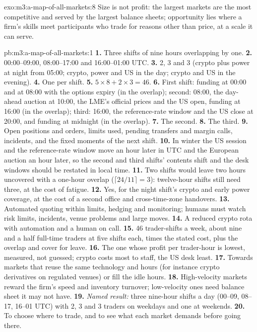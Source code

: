 \begin{solution}{exo:m3:a-map-of-all-markets:8}
Size is not profit: the largest markets are the most competitive and served by the largest balance sheets; opportunity lies where a firm's skills
meet participants who trade for reasons other than price, at a scale it can serve.
\end{solution}

\begin{solution}{pb:m3:a-map-of-all-markets:1}
\textbf{1.} Three shifts of nine hours overlapping by one. \textbf{2.} 00:00--09:00, 08:00--17:00 and 16:00--01:00 UTC. \textbf{3.} 2, 3 and 3
(crypto plus power at night from 05:00; crypto, power and US in the day; crypto and US in the evening). \textbf{4.} One per shift. \textbf{5.} $5
\times 8 + 2 \times 3 = 46$. \textbf{6.} First shift: funding at 00:00 and at 08:00 with the options expiry (in the overlap); second: 08:00, the
day-ahead auction at 10:00, the LME's official prices and the US open, funding at 16:00 (in the overlap); third: 16:00, the reference-rate window
and the US close at 20:00, and funding at midnight (in the overlap). \textbf{7.} The second. \textbf{8.} The third. \textbf{9.} Open positions and
orders, limits used, pending transfers and margin calls, incidents, and the fixed moments of the next shift. \textbf{10.} In winter the US session
and the reference-rate window move an hour later in UTC and the European auction an hour later, so the second and third shifts' contents shift and
the desk windows should be restated in local time. \textbf{11.} Two shifts would leave two hours uncovered with a one-hour overlap
($\lceil 24/11 \rceil = 3$): twelve-hour shifts still need three, at the cost of fatigue. \textbf{12.} Yes, for the night shift's crypto and early
power coverage, at the cost of a second office and cross-time-zone handovers. \textbf{13.} Automated quoting within limits, hedging and monitoring;
humans must watch risk limits, incidents, venue problems and large moves. \textbf{14.} A reduced crypto rota with automation and a human on call.
\textbf{15.} 46 trader-shifts a week, about nine and a half full-time traders at five shifts each, times the stated cost, plus the overlap and
cover for leave. \textbf{16.} The one whose profit per trader-hour is lowest, measured, not guessed; crypto costs most to staff, the US desk least.
\textbf{17.} Towards markets that reuse the same technology and hours (for instance crypto derivatives on regulated venues) or fill the idle hours.
\textbf{18.} High-velocity markets reward the firm's speed and inventory turnover; low-velocity ones need balance sheet it may not have.
\textbf{19.} \emph{Named result:} three nine-hour shifts a day (00--09, 08--17, 16--01 UTC) with 2, 3 and 3 traders on weekdays and one at weekends.
\textbf{20.} To choose where to trade, and to see what each market demands before going there.
\end{solution}

